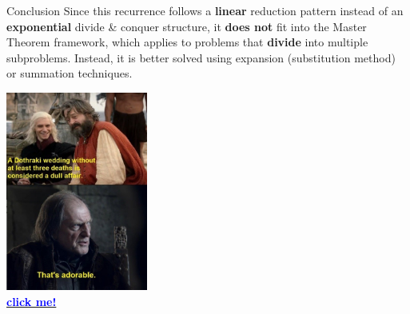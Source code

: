 \documentclass[aspectratio=169]{beamer}
\begin{document}
\begin{frame}{Conclusion}
    Since this recurrence follows a \textbf{linear} reduction pattern instead of an \textbf{exponential} divide \& conquer structure, it \textbf{does not} fit into the Master Theorem framework, which applies to problems that \textbf{divide} into multiple subproblems. Instead, it is better solved using expansion (substitution method) or summation techniques.
\end{frame}

\begin{frame}{ }
    \centering
    \includegraphics[width=0.35\textwidth]{figures/red_wedding.jpeg} \\
    \href{https://youtu.be/TZZpdHMo4UQ?si=RGrIhu2Hzv55pb5d}{\textcolor{blue}{\textbf{click me!}}}
\end{frame}
\end{document}
